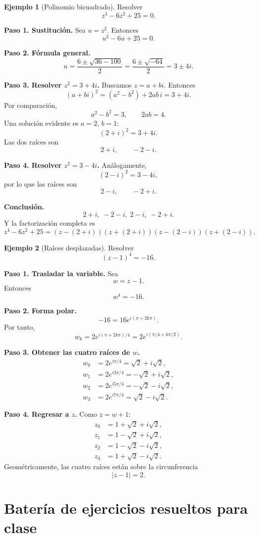 \documentclass[12pt]{article}
\theoremstyle{definition}
\newtheorem{ejemplo}{Ejemplo}[section]
\theoremstyle{remark}
\begin{document}
\begin{ejemplo}[Polinomio bicuadrado]
Resolver
\[
z^4-6z^2+25=0.
\]

\textbf{Paso 1. Sustitución.}
Sea $u=z^2$. Entonces
\[
u^2-6u+25=0.
\]

\textbf{Paso 2. Fórmula general.}
\[
u=\frac{6\pm\sqrt{36-100}}{2}
=\frac{6\pm\sqrt{-64}}{2}
=3\pm4i.
\]

\textbf{Paso 3. Resolver $z^2=3+4i$.}
Buscamos $z=a+bi$. Entonces
\[
(a+bi)^2=(a^2-b^2)+2ab\,i=3+4i.
\]
Por comparación,
\[
a^2-b^2=3,\qquad 2ab=4.
\]
Una solución evidente es $a=2$, $b=1$:
\[
(2+i)^2=3+4i.
\]
Las dos raíces son
\[
2+i,\qquad -2-i.
\]

\textbf{Paso 4. Resolver $z^2=3-4i$.}
Análogamente,
\[
(2-i)^2=3-4i,
\]
por lo que las raíces son
\[
2-i,\qquad -2+i.
\]

\textbf{Conclusión.}
\[
\boxed{2+i,\;-2-i,\;2-i,\;-2+i.}
\]
Y la factorización completa es
\[
\boxed{
z^4-6z^2+25=
(z-(2+i))(z+(2+i))(z-(2-i))(z+(2-i)).
}
\]
\end{ejemplo}

\begin{ejemplo}[Raíces desplazadas]
Resolver
\[
(z-1)^4=-16.
\]

\textbf{Paso 1. Trasladar la variable.}
Sea
\[
w=z-1.
\]
Entonces
\[
w^4=-16.
\]

\textbf{Paso 2. Forma polar.}
\[
-16=16e^{i(\pi+2k\pi)}.
\]
Por tanto,
\[
w_k=2e^{i(\pi+2k\pi)/4}
=2e^{i(\pi/4+k\pi/2)}.
\]

\textbf{Paso 3. Obtener las cuatro raíces de $w$.}
\[
\begin{aligned}
w_0&=2e^{i\pi/4}=\sqrt2+i\sqrt2,\\
w_1&=2e^{i3\pi/4}=-\sqrt2+i\sqrt2,\\
w_2&=2e^{i5\pi/4}=-\sqrt2-i\sqrt2,\\
w_3&=2e^{i7\pi/4}=\sqrt2-i\sqrt2.
\end{aligned}
\]

\textbf{Paso 4. Regresar a $z$.}
Como $z=w+1$:
\[
\boxed{
\begin{aligned}
z_0&=1+\sqrt2+i\sqrt2,\\
z_1&=1-\sqrt2+i\sqrt2,\\
z_2&=1-\sqrt2-i\sqrt2,\\
z_3&=1+\sqrt2-i\sqrt2.
\end{aligned}}
\]
Geométricamente, las cuatro raíces están sobre la circunferencia
\[
|z-1|=2.
\]
\end{ejemplo}

\section{Batería de ejercicios resueltos para clase}
\end{document}
